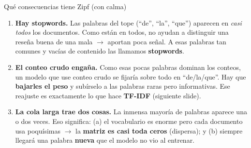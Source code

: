 \documentclass[aspectratio=169, 11pt]{beamer}
\begin{document}
\begin{frame}[shrink]{Qué consecuencias tiene Zipf (con calma)}
  \vspace{4pt}
  \begin{enumerate}\setlength{\itemsep}{7pt}\footnotesize
    \item[\textbf{1.}] \textbf{Hay stopwords.} Las palabras del tope (``de'', ``la'', ``que'') aparecen
      en \emph{casi todos} los documentos. Como están en todos, no ayudan a distinguir una reseña
      buena de una mala $\rightarrow$ aportan poca señal. A esas palabras tan comunes y vacías de
      contenido las llamamos \textbf{stopwords}.
    \item[\textbf{2.}] \textbf{El conteo crudo engaña.} Como esas pocas palabras dominan los conteos,
      un modelo que use conteo crudo se fijaría sobre todo en ``de/la/que''. Hay que \textbf{bajarles
      el peso} y subírselo a las palabras raras pero informativas. Ese reajuste es exactamente lo que
      hace \textbf{TF-IDF} (siguiente slide).
    \item[\textbf{3.}] \textbf{La cola larga trae dos cosas.} La inmensa mayoría de palabras aparece
      una o dos veces. Eso significa: (a) el vocabulario es enorme pero cada documento usa poquísimas
      $\rightarrow$ la \textbf{matriz es casi toda ceros} (dispersa); y (b) siempre llegará una palabra
      \textbf{nueva} que el modelo no vio al entrenar.
  \end{enumerate}
\end{frame}
\end{document}
